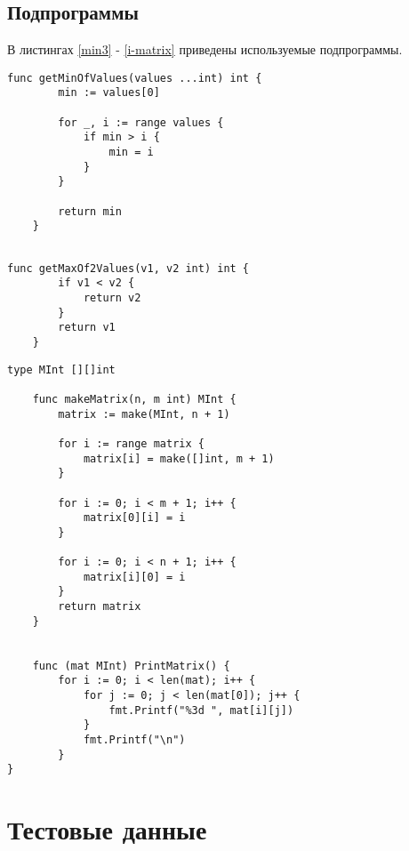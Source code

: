 \subsection{Подпрограммы}
В листингах \ref{min3} - \ref{i-matrix} приведены используемые подпрограммы.
\begin{lstlisting}[label=min3,caption=Функция нахождения минимума из N целых чисел]
	func getMinOfValues(values ...int) int {
		min := values[0]
		
		for _, i := range values {
			if min > i {
				min = i
			}
		}
		
		return min
	}
	
\end{lstlisting}

\begin{lstlisting}[label=max2,caption=Функция нахождения максимума из двух целых чисел]
	func getMaxOf2Values(v1, v2 int) int {
		if v1 < v2 {
			return v2
		}
		return v1
	}
\end{lstlisting}


\begin{lstlisting}[label=i-matrix,caption=Определение типа целочисленной матрицы; его инициализация и вывод]
	type MInt [][]int
	
	func makeMatrix(n, m int) MInt {
		matrix := make(MInt, n + 1)
		
		for i := range matrix {
			matrix[i] = make([]int, m + 1)
		}
		
		for i := 0; i < m + 1; i++ {
			matrix[0][i] = i
		}
		
		for i := 0; i < n + 1; i++ {
			matrix[i][0] = i
		}
		return matrix
	}
	

	func (mat MInt) PrintMatrix() {
		for i := 0; i < len(mat); i++ {
			for j := 0; j < len(mat[0]); j++ {
				fmt.Printf("%3d ", mat[i][j])
			}
			fmt.Printf("\n")
		}
}

\end{lstlisting}

\section{Тестовые данные}

